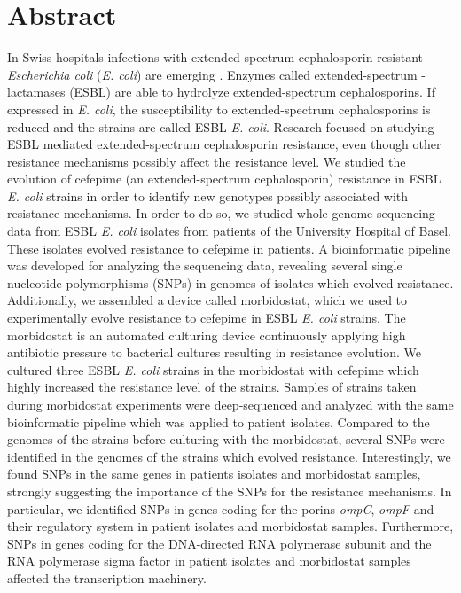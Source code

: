 \documentclass[12pt,twoside]{report}
\begin{document}
\chapter*{Abstract}
In Swiss hospitals infections with extended-spectrum cephalosporin resistant \textit{Escherichia coli} (\textit{E. coli}) are emerging \cite{swiss_hospitals}. Enzymes called extended-spectrum \textbeta-lactamases (ESBL) are able to hydrolyze extended-spectrum cephalosporins. If expressed in \textit{E. coli}, the susceptibility to extended-spectrum cephalosporins is reduced and the strains are called ESBL \textit{E. coli}. Research focused on studying ESBL mediated extended-spectrum cephalosporin resistance, even though other resistance mechanisms possibly affect the resistance level. We studied the evolution of cefepime (an extended-spectrum cephalosporin) resistance in ESBL \textit{E. coli} strains in order to identify new genotypes possibly associated with resistance mechanisms. In order to do so, we studied whole-genome sequencing data from ESBL \textit{E. coli} isolates from patients of the University Hospital of Basel. These isolates evolved resistance to cefepime in patients. A bioinformatic pipeline was developed for analyzing the sequencing data, revealing several single nucleotide polymorphisms (SNPs) in genomes of isolates which evolved resistance.
Additionally, we assembled a device called morbidostat, which we used to experimentally evolve resistance to cefepime in ESBL \textit{E. coli} strains. The morbidostat is an automated culturing device continuously applying high antibiotic pressure to bacterial cultures resulting in resistance evolution. We cultured three ESBL \textit{E. coli} strains in the morbidostat with cefepime which highly increased the resistance level of the strains. Samples of strains taken during morbidostat experiments were deep-sequenced and analyzed with the same bioinformatic pipeline which was applied to patient isolates. Compared to the genomes of the strains before culturing with the morbidostat, several SNPs were identified in the genomes of the strains which evolved resistance. Interestingly, we found SNPs in the same genes in patients isolates and morbidostat samples, strongly suggesting the importance of the SNPs for the resistance mechanisms. In particular, we identified SNPs in genes coding for the porins \textit{ompC}, \textit{ompF} and their regulatory system in patient isolates and morbidostat samples. Furthermore, SNPs in genes coding for the DNA-directed RNA polymerase subunit \textbeta \space and the RNA polymerase sigma factor in patient isolates and morbidostat samples affected the transcription machinery.  
\end{document}
